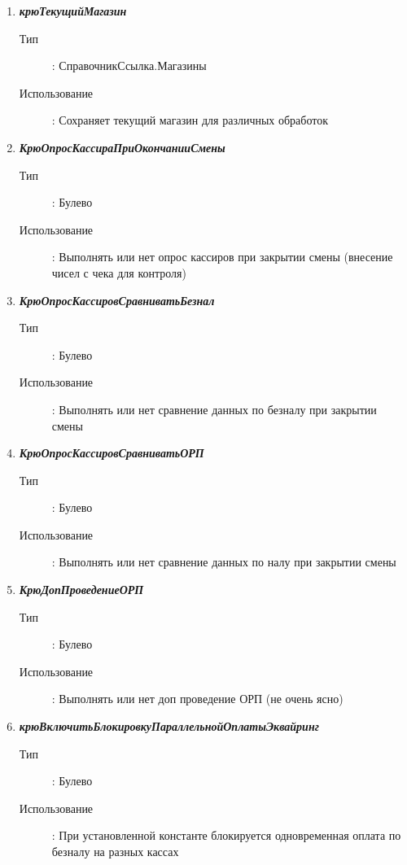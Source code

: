 \begin{enumerate}[label=(\arabic*)]
\vspace{\baselineskip}
\item \textbf{\textit{крюТекущийМагазин}}
\begin{description}
    \item[Тип] : СправочникСсылка.Магазины
    \item[Использование]: Сохраняет текущий магазин для различных обработок
\end{description}

\vspace{\baselineskip}
\item \textbf{\textit{КрюОпросКассираПриОкончанииСмены}}
\begin{description}
    \item[Тип] : Булево
    \item[Использование]: Выполнять или нет опрос кассиров при закрытии смены (внесение чисел с чека для контроля)
\end{description}

\vspace{\baselineskip}
\item \textbf{\textit{КрюОпросКассировСравниватьБезнал}}
\begin{description}
    \item[Тип] : Булево
    \item[Использование]: Выполнять или нет сравнение данных по безналу при закрытии смены
\end{description}

\vspace{\baselineskip}
\item \textbf{\textit{КрюОпросКассировСравниватьОРП}}
\begin{description}
    \item[Тип] : Булево
    \item[Использование]: Выполнять или нет сравнение данных по налу при закрытии смены
\end{description}

\vspace{\baselineskip}
\item \textbf{\textit{КрюДопПроведениеОРП}}
\begin{description}
    \item[Тип] : Булево
    \item[Использование]: Выполнять или нет доп проведение ОРП (не очень ясно)
\end{description}

\vspace{\baselineskip}
\item \textbf{\textit{крюВключитьБлокировкуПараллельнойОплатыЭквайринг}}
\begin{description}
    \item[Тип] : Булево
    \item[Использование]: При установленной константе блокируется одновременная оплата по безналу на разных кассах
\end{description}


\end{enumerate}
